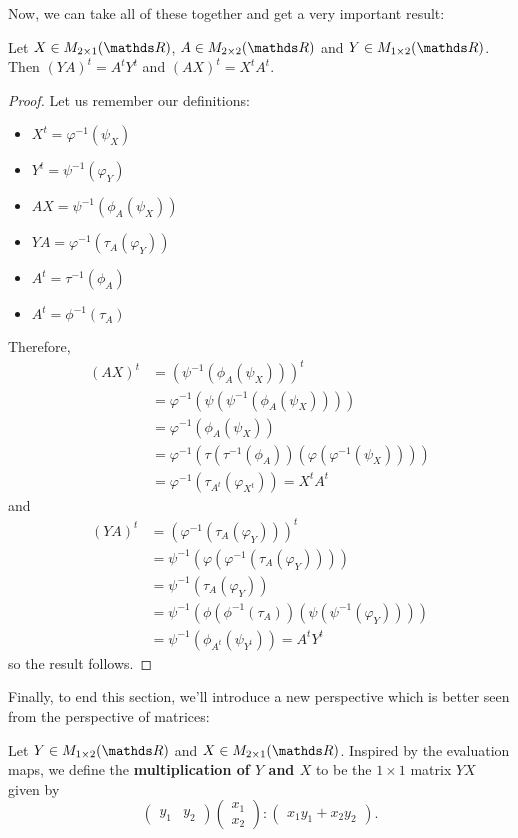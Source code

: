 Now, we can take all of these together and get a very important result:

\begin{theorem}
	Let $X\in M_{2\times 1}(\R)$, $A\in M_{2\times 2}(\R)$ and $Y\in M_{1\times 2}(\R)$. Then $(YA)^t=A^tY^t$ and $(AX)^t=X^tA^t$.
\end{theorem}
\begin{proof}
	Let us remember our definitions:
	\begin{multicols}{3}
		\begin{itemize}
			\item \(X^t=\varphi^{-1}(\psi_X)\)
			\item \(Y^t=\psi^{-1}(\varphi_Y)\)
			\item \(AX=\psi^{-1}(\phi_A(\psi_X))\)
			\item \(YA=\varphi^{-1}(\tau_A(\varphi_Y))\)
			\item \(A^t=\tau^{-1}(\phi_A)\)
			\item \(A^t=\phi^{-1}(\tau_A)\)
		\end{itemize}
	\end{multicols}

Therefore, 
\begin{align*}
	(AX)^t&=(\psi^{-1}(\phi_A(\psi_X)))^t\\
	&=\varphi^{-1}(\psi(\psi^{-1}(\phi_A(\psi_X))))\\
	&=\varphi^{-1}(\phi_A(\psi_X))\\
	&=\varphi^{-1}(\tau(\tau^{-1}(\phi_A))(\varphi(\varphi^{-1}(\psi_X))))\\
	&=\varphi^{-1}(\tau_{A^t}(\varphi_{X^t}))=X^tA^t
\end{align*}and
\begin{align*}
(YA)^t&=(\varphi^{-1}(\tau_A(\varphi_Y)))^t\\
&=\psi^{-1}(\varphi(\varphi^{-1}(\tau_A(\varphi_Y))))\\
&=\psi^{-1}(\tau_A(\varphi_Y))\\
&=\psi^{-1}(\phi(\phi^{-1}(\tau_A))(\psi(\psi^{-1}(\varphi_Y))))\\
&=\psi^{-1}(\phi_{A^t}(\psi_{Y^t}))=A^tY^t
\end{align*}so the result follows.
\end{proof}

Finally, to end this section, we'll introduce a new perspective which is better seen from the perspective of matrices:

\begin{df}
	Let $Y\in M_{1\times 2}(\R)$ and $X\in M_{2\times 1}(\R)$. Inspired by the evaluation maps, we define the \textbf{multiplication of $Y$ and $X$} to be the $1\times 1$ matrix $YX$ given by \[\begin{pmatrix}
	y_1&y_2
	\end{pmatrix}\begin{pmatrix}
	x_1\\x_2
	\end{pmatrix}:\begin{pmatrix}
	x_1y_1+x_2y_2
	\end{pmatrix}.\]
\end{df}

